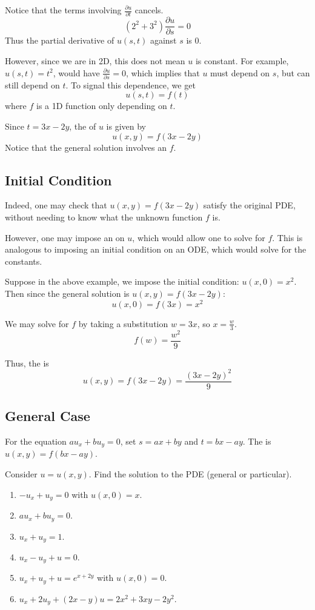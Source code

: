 \documentclass[11pt,fleqn]{book} %
\begin{document}
Notice that the terms involving $\frac{\partial u}{\partial t}$ cancels. $$(2^2 + 3^2) \frac{\partial u}{\partial s} = 0$$ Thus the partial derivative of $u(s, t)$ against $s$ is $0$. 

However, since we are in 2D, this does not mean $u$ is constant. For example, $u(s, t) = t^2$, would have $\frac{\partial u}{\partial s} = 0$, which implies that $u$ must  depend on $s$, but can still depend on $t$. To signal this dependence, we get $$u(s, t) = f(t)$$ where $f$ is a 1D function only depending on $t$. 

Since $t = 3x - 2y$, the  of $u$ is given by $$u(x, y) = f(3x - 2y)$$ Notice that the general solution involves an  $f$.

\subsection*{Initial Condition}

Indeed, one may check that $u(x, y) = f (3x - 2y)$ satisfy the original PDE, without needing to know what the unknown function $f$ is.

However, one may impose an  on $u$, which would allow one to solve for $f$. This is analogous to imposing an initial condition on an ODE, which would solve for the constants.

Suppose in the above example, we impose the initial condition: $u(x, 0) = x^2$. Then since the general solution is $u(x, y) = f(3x - 2y)$: $$u(x,0) = f(3x) = x^2$$

We may solve for $f$ by taking a substitution $w = 3x$, so $x = \frac{w}{3}$. $$f(w) = \frac{w^2}{9}$$ 

Thus, the  is $$u(x,y) = f(3x-2y) = \frac{(3x-2y)^2}{9}$$

\subsection*{General Case}

For the equation $au_x +bu_y = 0$, set $s = ax + by$ and $t = bx - ay$. The  is $u(x, y) = f (bx - ay)$.

\begin{exercise}
    Consider $u = u(x, y)$. Find the solution to the PDE (general or particular). 

    \begin{enumerate}
        \item $-u_x + u_y = 0$ with $u(x, 0) = x$.
        \item $au_x + bu_y = 0$.
        \item $u_x + u_y = 1$.
        \item $u_x - u_y + u = 0$.
        \item $u_x + u_y + u = e^{x+2y}$ with $u(x, 0) = 0$. 
        \item $u_x + 2u_y +(2x - y)u = 2x^2 +3xy - 2y^2$.
    \end{enumerate}
\end{exercise}
\end{document}
